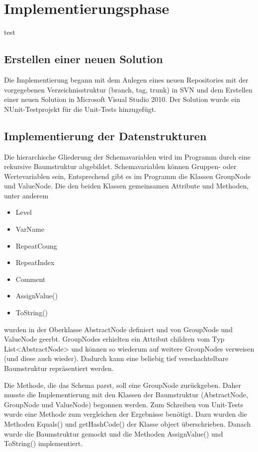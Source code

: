 \section{Implementierungsphase} 
\label{sec:Implementierungsphase}

test
\subsection{Erstellen einer neuen Solution}
\label{sec:ErstellungSolution}
Die Implementierung begann mit dem Anlegen eines neuen Repositories mit der vorgegebenen Verzeichnisstruktur (branch, tag, trunk) in SVN und dem Erstellen einer neuen Solution in Microsoft Visual Studio 2010. Der Solution wurde ein NUnit-Testprojekt für die Unit-Tests hinzugefügt.

\subsection{Implementierung der Datenstrukturen}
\label{sec:ImplementierungDatenstrukturen}
Die hierarchische Gliederung der Schemavariablen wird im Programm durch eine rekursive Baumstruktur abgebildet. Schemavariablen können Gruppen- oder Wertevariablen sein, Entsprechend gibt es im Programm die Klassen GroupNode und ValueNode. Die den beiden Klassen gemeinsamen Attribute und Methoden, unter anderem
\begin{itemize}
\item Level
\item VarName
\item RepeatCoung
\item RepeatIndex
\item Comment
\item AssignValue()
\item ToString()
\end{itemize} wurden in der Oberklasse AbstractNode definiert und von GroupNode und ValueNode geerbt.
GroupNodes erhielten ein Attribut children vom Typ List<AbstractNode> und können so wiederum auf weitere GroupNodes verweisen (und diese auch wieder). Dadurch kann eine beliebig tief verschachtelbare Baumstruktur repräsentiert werden. 


Die Methode, die das Schema parst, soll eine GroupNode zurückgeben. Daher musste die Implementierung mit den Klassen der Baumstruktur (AbstractNode, GroupNode und ValueNode) begonnen werden. Zum Schreiben von Unit-Tests wurde eine Methode zum vergleichen der Ergebnisse benötigt. Dazu wurden die Methoden Equals() und getHashCode() der Klasse object überschrieben. Danach wurde die Baumstruktur gemockt und die Methoden AssignValue() und ToString() implementiert.

